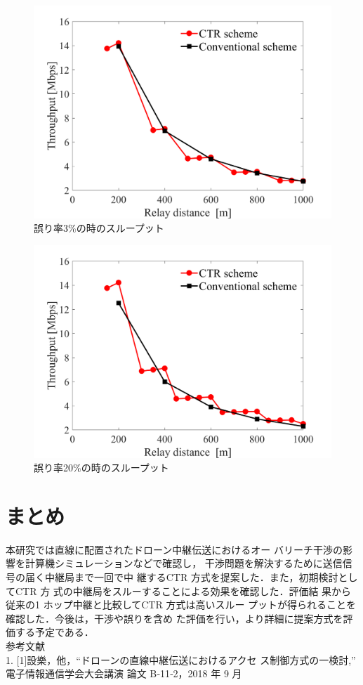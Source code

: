 \documentclass[a4paper,10pt]{ltjsarticle}
\begin{document}
\begin{figure}[H]
  \centering
  \includegraphics[width=\linewidth]{throughput_probabilistic_retry_0.03.png} %
  \caption{誤り率3\%の時のスループット}
  \label{fig:Throughput_0.03} %
\end{figure}
\begin{figure}[H]
  \centering
  \includegraphics[width=\linewidth]{throughput_probabilistic_retry_0.2.png} %
  \caption{誤り率20\%の時のスループット}
  \label{fig:Throughput_0.2} %
\end{figure}
\section{まとめ}
本研究では直線に配置されたドローン中継伝送におけるオー
バリーチ干渉の影響を計算機シミュレーションなどで確認し，
干渉問題を解決するために送信信号の届く中継局まで一回で中
継するCTR 方式を提案した．また，初期検討としてCTR 方
式の中継局をスルーすることによる効果を確認した．評価結
果から従来の1 ホップ中継と比較してCTR 方式は高いスルー
プットが得られることを確認した．今後は，干渉や誤りを含め
た評価を行い，より詳細に提案方式を評価する予定である．
\\参考文献
\\1. [1]設樂，他，“ドローンの直線中継伝送におけるアクセ
ス制御方式の一検討,” 電子情報通信学会大会講演
論文 B‐11‐2，2018 年 9 月

\end{document}
